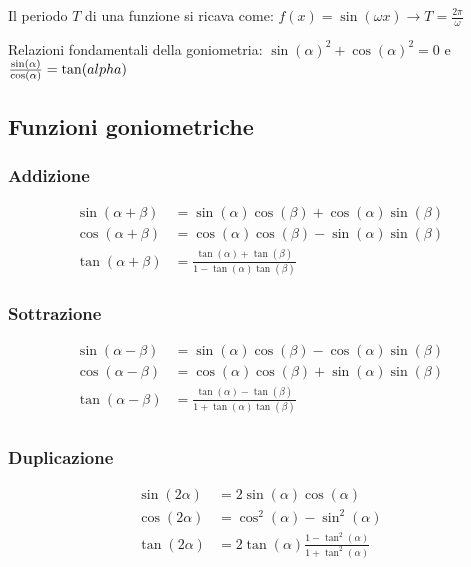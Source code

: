Il periodo $T$ di una funzione si ricava come: $f(x)=\sin(\omega x) \rightarrow T=\frac{2\pi}{\omega}$

Relazioni fondamentali della goniometria: $\sin(\alpha)^2 + \cos(\alpha)^2 = 0$ e $\frac{\sin(\alpha)}{\cos(\alpha)} = \tan(\\alpha)$

\subsection{Funzioni goniometriche}

\subsubsection*{Addizione}

\begin{align}
    \sin(\alpha+\beta) & = \sin(\alpha)\cos(\beta)+\cos(\alpha)\sin(\beta)
    \label{eq:goniometria_formule_di_addizione_seno}                                  \\
    \cos(\alpha+\beta) & = \cos(\alpha)\cos(\beta)-\sin(\alpha)\sin(\beta)
    \label{eq:goniometria_formule_di_addizione_coseno}                                \\
    \tan(\alpha+\beta) & = \frac{\tan(\alpha)+\tan(\beta)}{1-\tan(\alpha)\tan(\beta)}
    \label{eq:goniometria_formule_di_addizione_tangente}
\end{align}

\subsubsection*{Sottrazione}
\begin{align}
    \sin(\alpha-\beta) & = \sin(\alpha)\cos(\beta)-\cos(\alpha)\sin(\beta)
    \label{eq:goniometria_formule_di_sottrazione_seno}                                \\
    \cos(\alpha-\beta) & = \cos(\alpha)\cos(\beta)+\sin(\alpha)\sin(\beta)
    \label{eq:goniometria_formule_di_sottrazione_coseno}                              \\
    \tan(\alpha-\beta) & = \frac{\tan(\alpha)-\tan(\beta)}{1+\tan(\alpha)\tan(\beta)}
    \label{eq:goniometria_formule_di_sottrazione_tangente}                            \\
\end{align}

\subsubsection*{Duplicazione}
\begin{align}
    \sin(2\alpha) & = 2\sin(\alpha)\cos(\alpha)
    \label{eq:goniometria_formule_di_duplicazione_seno}                      \\
    \cos(2\alpha) & = \cos^2(\alpha)-\sin^2(\alpha)
    \label{eq:goniometria_formule_di_duplicazione_coseno}                    \\
    \tan(2\alpha) & = 2\tan(\alpha)\frac{1-\tan^2(\alpha)}{1+\tan^2(\alpha)}
    \label{eq:goniometria_formule_di_duplicazione_tangente}
\end{align}

